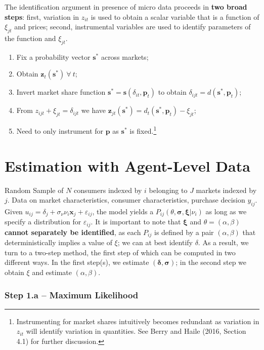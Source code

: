 \documentclass[11pt]{article}
\begin{document}
The identification argument in presence of micro data proceeds in \textbf{two broad steps}: first, variation in $z_{it}$ is used to obtain a scalar variable that is a function of $\xi_{jt}$ and prices; second, instrumental variables are used to identify parameters of the function and $\xi_{jt}$.
\begin{enumerate}
	\item Fix a probability vector $\bm{s}^*$ across markets;
	\item Obtain $\bm{z}_t(\bm{s}^*) ~\forall~ t$;
	\item Invert market share function $\bm{s}^* = \bm{s}(\delta_{it},\bm{p}_t)$ to obtain $\delta_{ijt} = d(\bm{s}^*,\bm{p}_t)$;
	\item From $z_{ijt} + \xi_{jt} = \delta_{ijt}$ we have $\bm{z}_{jt}(\bm{s}^*) = d_t(\bm{s}^*,\bm{p}_t) - \xi_{jt}$;
	\item Need to only instrument for $\bm{p}$ as $\bm{s}^*$ is fixed.\footnote{Instrumenting for market shares intuitively becomes redundant as variation in $z_{it}$ will identify variation in quantities. See Berry and Haile (2016, Section 4.1) for further discussion.}
\end{enumerate}

\section{Estimation with Agent-Level Data}
\label{agentest}
Random Sample of $N$ consumers indexed by $i$ belonging to $J$ markets indexed by $j$.
Data on market characteristics, consumer characteristics, purchase decision $y_{ij}$. \\

Given $u_{ij} = \delta_j + \sigma_\nu \nu_i \bm{x}_j + \varepsilon_{ij}$, the model yields a $P_{ij}(\theta, \bm{\sigma}, \bm{\xi} | \nu_i)$ as long as we specify a distribution for $\varepsilon_{ij}$.
It is important to note that $\bm{\xi}$ and $\theta = (\alpha, \beta)$ \textbf{cannot separately be identified}, as each $P_{ij}$ is defined by a pair $(\alpha, \beta)$ that deterministically implies a value of $\xi$; we can at best identify $\delta$.
As a result, we turn to a two-step method, the first step of which can be computed in two different ways. In the first step(s), we estimate $(\bm{\delta, \sigma})$; in the second step we obtain $\xi$ and estimate $(\alpha, \beta)$.

\subsubsection*{Step 1.a -- Maximum Likelihood}
\end{document}

